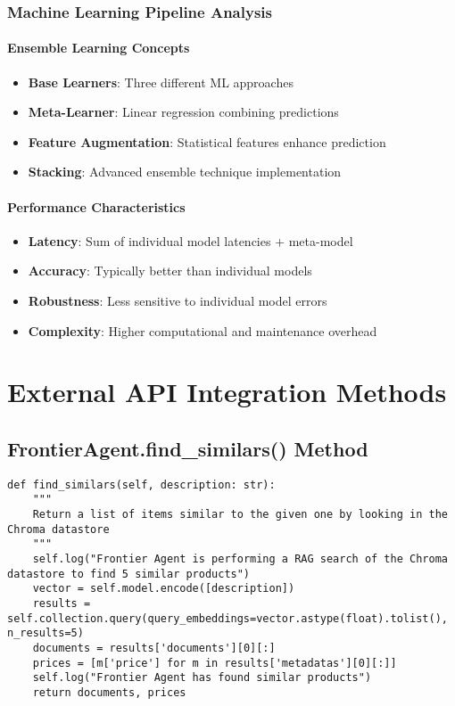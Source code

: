 \subsubsection{Machine Learning Pipeline Analysis}

\paragraph{Ensemble Learning Concepts}
\begin{itemize}
\item \textbf{Base Learners}: Three different ML approaches
\item \textbf{Meta-Learner}: Linear regression combining predictions
\item \textbf{Feature Augmentation}: Statistical features enhance prediction
\item \textbf{Stacking}: Advanced ensemble technique implementation
\end{itemize}

\paragraph{Performance Characteristics}
\begin{itemize}
\item \textbf{Latency}: Sum of individual model latencies + meta-model
\item \textbf{Accuracy}: Typically better than individual models
\item \textbf{Robustness}: Less sensitive to individual model errors
\item \textbf{Complexity}: Higher computational and maintenance overhead
\end{itemize}

\section{External API Integration Methods}

\subsection{FrontierAgent.find\_similars() Method}

\begin{lstlisting}[caption=Vector Similarity Search Analysis]
def find_similars(self, description: str):
    """
    Return a list of items similar to the given one by looking in the Chroma datastore
    """
    self.log("Frontier Agent is performing a RAG search of the Chroma datastore to find 5 similar products")
    vector = self.model.encode([description])
    results = self.collection.query(query_embeddings=vector.astype(float).tolist(), n_results=5)
    documents = results['documents'][0][:]
    prices = [m['price'] for m in results['metadatas'][0][:]]
    self.log("Frontier Agent has found similar products")
    return documents, prices
\end{lstlisting}

